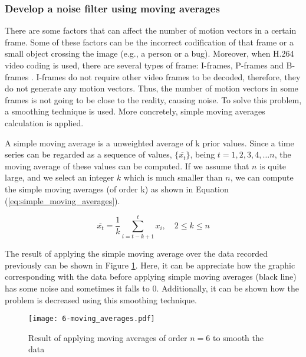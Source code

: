 \subsubsection{Develop a noise filter using moving averages}
There are some factors that can affect the number of motion vectors in a certain frame. Some of these factors can be the incorrect codification of that frame or a small object crossing the image (e.g., a person or a bug). Moreover, when H.264 video coding is used, there are several types of frame: I-frames, P-frames and B-frames . I-frames do not require other video frames to be decoded, therefore, they do not generate any motion vectors. Thus, the number of motion vectors in some frames is not going to be close to the reality, causing noise. To solve this problem, a smoothing technique is used. More concretely, simple moving averages calculation is applied.

A simple moving average \cite{Smi15} is a unweighted average of k prior values. Since a time series can be regarded as a sequence of values, $\{\overline {x_{t}}\}$, being $t=1,2,3,4,…n$, the moving average of these values can be computed. If we assume that $n$ is quite large, and we select an integer $k$ which is much smaller than $n$, we can compute the simple moving averages (of order k) as shown in Equation (\ref{eq:simple_moving_averages}).

\begin{equation} \label{eq:simple_moving_averages}
\overline { { x }_{ t } } =\frac { 1 }{ k } \sum _{ i=t-k+1 }^{ t }{ { x }_{ i } } ,\quad 2\le k\le n
\end{equation}

The result of applying the simple moving average over the data recorded previously can be shown in Figure \ref{fig:6-moving_averages}. Here, it can be appreciate how the graphic corresponding with the data before applying simple moving averages (black line) has some noise and sometimes it falls to 0. Additionally, it can be shown how the problem is decreased using this smoothing technique.

\begin{figure}[!h]
	\begin{center}
		\texttt{[image: 6-moving\_averages.pdf]}
		\caption{Result of applying moving averages of order $n = 6$ to smooth the data}
		\label{fig:6-moving_averages}
	\end{center}
\end{figure}


